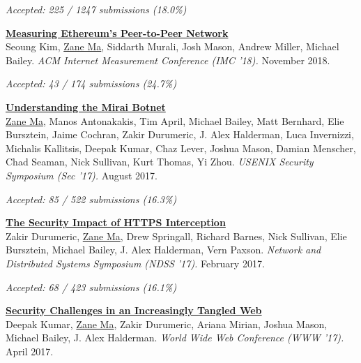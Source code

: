 \documentclass[10pt,singlecolumn]{article} %
\begin{document}
{\raggedleft\textit{Accepted: 225 / 1247 submissions (18.0\%)}\par}
\vspace{6pt}


\textbf{\href{https://zanema.com/papers/imc18_ethpeers.pdf}{Measuring Ethereum's Peer-to-Peer Network}}\\
Seoung Kim, \underline{Zane Ma}, Siddarth Murali, Josh Mason, Andrew Miller, Michael Bailey.
\textit{ACM Internet Measurement Conference (IMC '18).} November 2018.

{\raggedleft\textit{Accepted: 43 / 174 submissions (24.7\%)}\par}
\vspace{6pt}


\textbf{\href{https://zanema.com/papers/usenix17_mirai.pdf}{Understanding the Mirai Botnet}}\\
\underline{Zane Ma}, Manos Antonakakis, Tim April, Michael Bailey, Matt Bernhard, Elie Bursztein, Jaime Cochran, Zakir Durumeric, J. Alex Halderman, Luca Invernizzi, Michalis Kallitsis, Deepak Kumar, Chaz Lever, Joshua Mason, Damian Menscher, Chad Seaman, Nick Sullivan, Kurt Thomas, Yi Zhou.
\textit{USENIX Security Symposium (Sec '17).} August 2017.

{\raggedleft\textit{Accepted: 85 / 522 submissions (16.3\%)}\par}
\vspace{6pt}


\textbf{\href{https://zanema.com/papers/ndss17_interception.pdf}{The Security Impact of HTTPS Interception}}\\
Zakir Durumeric, \underline{Zane Ma}, Drew Springall, Richard Barnes, Nick Sullivan, Elie Bursztein, Michael
Bailey, J. Alex Halderman, Vern Paxson.
\textit{Network and Distributed Systems Symposium (NDSS '17).} February 2017.

{\raggedleft\textit{Accepted: 68 / 423 submissions (16.1\%)}\par}
\vspace{6pt}


\textbf{\href{https://zanema.com/papers/www17_tangled.pdf}{Security Challenges in an Increasingly Tangled Web}}\\
Deepak Kumar, \underline{Zane Ma}, Zakir Durumeric, Ariana Mirian, Joshua Mason, Michael Bailey, J. Alex Halderman.
\textit{World Wide Web Conference (WWW '17).} April 2017.
\end{document}
